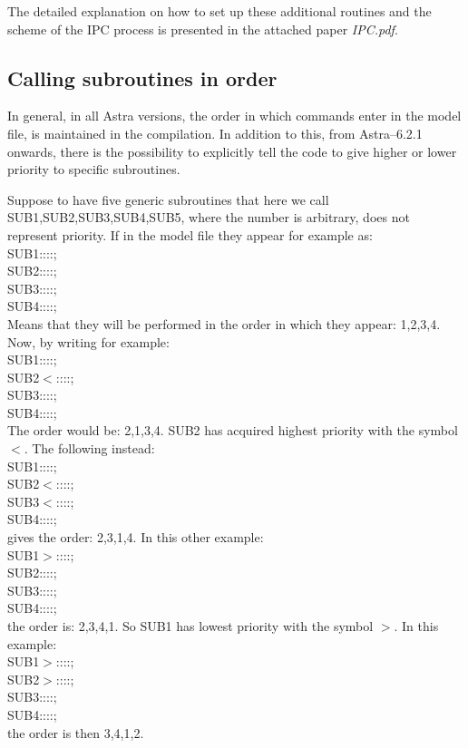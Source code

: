 The detailed explanation on how to set up these additional routines and the scheme of the IPC process is presented in the attached paper {\it IPC.pdf}.
%
\subsection{Calling subroutines in order}
In general, in all Astra versions, the order in which commands enter in the model file, is maintained in the compilation. In addition to this, from Astra--6.2.1 onwards, there is the possibility to explicitly tell the code to give higher or lower priority to specific subroutines.

Suppose to have five generic subroutines that here we call SUB1,SUB2,SUB3,SUB4,SUB5, where the number is arbitrary, does not represent priority.
If in the model file they appear for example as:\\
SUB1::::;\\
SUB2::::;\\
SUB3::::;\\
SUB4::::;\\
Means that they will be performed in the order in which they appear: 1,2,3,4.
Now, by writing for example:\\
SUB1::::;\\
SUB2$<$::::;\\
SUB3::::;\\
SUB4::::;\\
The order would be: 2,1,3,4. SUB2 has acquired highest priority with the symbol $<$.
The following instead:\\
SUB1::::;\\
SUB2$<$::::;\\
SUB3$<$::::;\\
SUB4::::;\\
gives the order: 2,3,1,4.
In this other example:\\
SUB1$>$::::;\\ 
SUB2::::;\\
SUB3::::;\\
SUB4::::;\\
the order is: 2,3,4,1. So SUB1 has lowest priority with the symbol $>$.
In this example:\\
SUB1$>$::::;\\
SUB2$>$::::;\\
SUB3::::;\\
SUB4::::;\\
the order is then 3,4,1,2.



%

\clearpage
